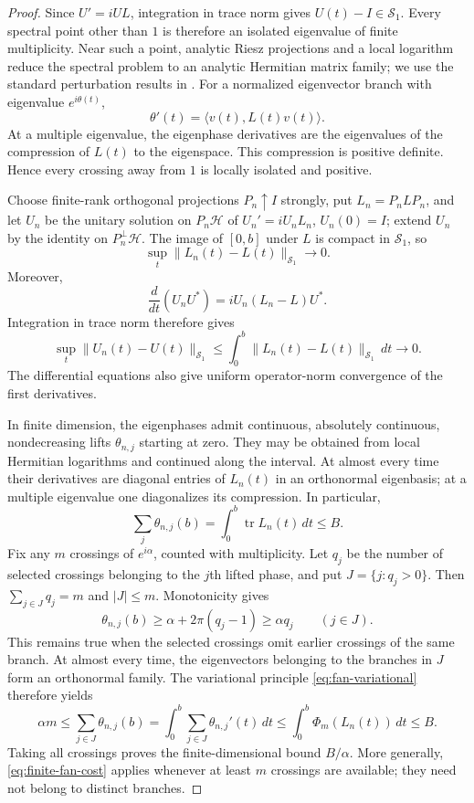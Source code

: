\documentclass[11pt]{amsart}
\numberwithin{equation}{section}
\newcommand{\Hh}{\mathcal H}
\newcommand{\Id}{I}
\newcommand{\tr}{\operatorname{tr}}
\newcommand{\ip}[2]{\langle #1,#2\rangle}
\newcommand{\norm}[1]{\lVert #1\rVert}
\begin{document}
\begin{proof}
Since $U'=iUL$, integration in trace norm gives
$U(t)-\Id\in\mathcal S_1$. Every spectral point other than $1$
is therefore an isolated eigenvalue of finite multiplicity.
Near such a point, analytic Riesz projections and a local logarithm
reduce the spectral problem to an analytic Hermitian matrix family;
we use the standard perturbation results in
\cite[Chapters II and VII]{Kato}. For a normalized eigenvector
branch with eigenvalue $e^{i\theta(t)}$,
\[
 \theta'(t)=\ip{v(t)}{L(t)v(t)}.
\]
At a multiple eigenvalue, the eigenphase derivatives are the
eigenvalues of the compression of $L(t)$ to the eigenspace.
This compression is positive definite. Hence every crossing away
from $1$ is locally isolated and positive.

Choose finite-rank orthogonal projections $P_n\uparrow\Id$ strongly,
put $L_n=P_nLP_n$, and let $U_n$ be the unitary solution on
$P_n\Hh$ of $U_n'=iU_nL_n$, $U_n(0)=\Id$; extend $U_n$ by the
identity on $P_n^\perp\Hh$. The image of $[0,b]$ under $L$ is
compact in $\mathcal S_1$, so
\[
 \sup_t\norm{L_n(t)-L(t)}_{\mathcal S_1}\longrightarrow0.
\]
Moreover,
\[
 \frac{d}{dt}(U_nU^*)=iU_n(L_n-L)U^*.
\]
Integration in trace norm therefore gives
\begin{equation}\label{eq:approx}
 \sup_t\norm{U_n(t)-U(t)}_{\mathcal S_1}
 \le\int_0^b\norm{L_n(t)-L(t)}_{\mathcal S_1}\,dt
 \longrightarrow0.
\end{equation}
The differential equations also give uniform operator-norm
convergence of the first derivatives.

In finite dimension, the eigenphases admit continuous,
absolutely continuous, nondecreasing lifts $\theta_{n,j}$ starting
at zero. They may be obtained from local Hermitian logarithms and
continued along the interval. At almost every time their derivatives
are diagonal entries of $L_n(t)$ in an orthonormal eigenbasis; at a
multiple eigenvalue one diagonalizes its compression. In particular,
\[
 \sum_j\theta_{n,j}(b)=\int_0^b\tr L_n(t)\,dt\le B.
\]
Fix any $m$ crossings of $e^{i\alpha}$, counted with multiplicity.
Let $q_j$ be the number of selected crossings belonging to the
$j$th lifted phase, and put $J=\{j:q_j>0\}$. Then
$\sum_{j\in J}q_j=m$ and $|J|\le m$. Monotonicity gives
\[
 \theta_{n,j}(b)\ge\alpha+2\pi(q_j-1)\ge\alpha q_j
 \qquad(j\in J).
\]
This remains true when the selected crossings omit earlier crossings
of the same branch. At almost every time, the eigenvectors belonging
to the branches in $J$ form an orthonormal family. The variational
principle \eqref{eq:fan-variational} therefore yields
\begin{equation}\label{eq:finite-fan-cost}
 \alpha m\le\sum_{j\in J}\theta_{n,j}(b)
 =\int_0^b\sum_{j\in J}\theta_{n,j}'(t)\,dt
 \le\int_0^b\Phi_m(L_n(t))\,dt\le B.
\end{equation}
Taking all crossings proves the finite-dimensional bound $B/\alpha$.
More generally, \eqref{eq:finite-fan-cost} applies whenever at least
$m$ crossings are available; they need not belong to distinct branches.


\end{proof}
\end{document}
